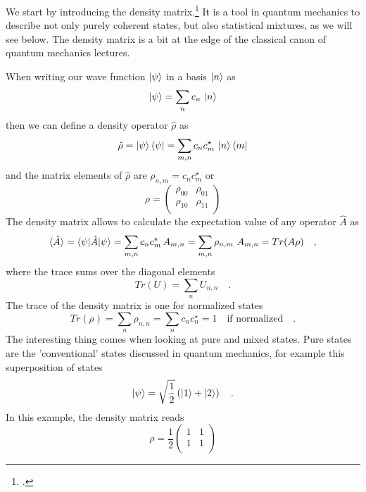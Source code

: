 We start by introducing the density matrix.\footcite{Rand2016,Parson,Hamm-dummies}
It is a tool in quantum mechanics to describe not only purely coherent states, but also statistical mixtures, as we will see below. The density matrix is a bit at the edge of the classical canon of quantum mechanics lectures.

When  writing our wave function $\ket{\psi}$ in  a basis $\ket{n}$ as
\begin{equation}
 \ket{\psi} = \sum_n c_n \, \ket{n}
\end{equation}
then we can define a density operator $\hat{\rho}$ as
\begin{equation}
\hat{\rho} =  \ket{\psi}\bra{\psi} = \sum_{m,n} c_n c_m^\star \, \ket{n}\bra{m}
\end{equation}
and the matrix elements of $\hat{\rho}$ are $\rho_{n,m} =  c_n c_m^\star$ or 
\begin{equation}
 \rho = \begin{pmatrix}
  \rho_{00} &   \rho_{01} \\  \rho_{10} &  \rho_{11} \\
 \end{pmatrix}
\end{equation} 
The density matrix allows to calculate the expectation value of any operator $\hat{A}$ as
\begin{equation}
 \braket{\hat{A}} =  \braket{\psi | \hat{A} | \psi}  = \sum_{m,n} c_n c_m^\star \, A_{m,n} = \sum_{m,n} \rho_{n,m} \,  \, A_{m,n} = Tr ( A \rho) \quad ,
\end{equation}
where the trace sums over the diagonal elements
\begin{equation}
 Tr (U ) = \sum_n U_{n,n}  \quad .
\end{equation}
The trace of the density matrix is one for normalized states 
\begin{equation}
 Tr (\rho) = \sum_n \rho_{n,n} = \sum_n c_n c_n^\star = 1 \quad \text{if normalized} \quad .
\end{equation}
The interesting thing comes when looking at pure and mixed states. Pure states are the 'conventional' states discussed in quantum mechanics, for example this superposition of states
\begin{equation}
\ket{\psi} = \sqrt{\frac{1}{2}} \left( \ket{1} + \ket{2} \right)  \quad .
\end{equation}
In this example, the density matrix reads
\begin{equation}
 \rho = \frac{1}{2} \begin{pmatrix}
 1 & 1 \\ 1 & 1 \\
 \end{pmatrix}
\end{equation}
